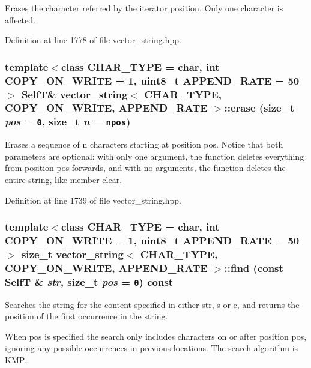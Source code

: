 Erases the character referred by the iterator position. Only one character is affected. 

Definition at line 1778 of file vector\_\-string.hpp.\hypertarget{classvector__string_11798027c9245194f48e666c45e0d6d9}{
\subsubsection[{erase}]{\setlength{\rightskip}{0pt plus 5cm}template$<$class CHAR\_\-TYPE  = char, int COPY\_\-ON\_\-WRITE = 1, uint8\_\-t APPEND\_\-RATE = 50$>$ {\bf SelfT}\& {\bf vector\_\-string}$<$ CHAR\_\-TYPE, COPY\_\-ON\_\-WRITE, APPEND\_\-RATE $>$::erase (size\_\-t {\em pos} = {\tt 0}, \/  size\_\-t {\em n} = {\tt {\bf npos}})}}
\label{classvector__string_11798027c9245194f48e666c45e0d6d9}


Erases a sequence of n characters starting at position pos. Notice that both parameters are optional: with only one argument, the function deletes everything from position pos forwards, and with no arguments, the function deletes the entire string, like member clear. 

Definition at line 1739 of file vector\_\-string.hpp.\hypertarget{classvector__string_5e64e995b1eea8c254bb5ade28fcbf0b}{
\subsubsection[{find}]{\setlength{\rightskip}{0pt plus 5cm}template$<$class CHAR\_\-TYPE  = char, int COPY\_\-ON\_\-WRITE = 1, uint8\_\-t APPEND\_\-RATE = 50$>$ size\_\-t {\bf vector\_\-string}$<$ CHAR\_\-TYPE, COPY\_\-ON\_\-WRITE, APPEND\_\-RATE $>$::find (const {\bf SelfT} \& {\em str}, \/  size\_\-t {\em pos} = {\tt 0}) const}}
\label{classvector__string_5e64e995b1eea8c254bb5ade28fcbf0b}


Searches the string for the content specified in either str, s or c, and returns the position of the first occurrence in the string.

When pos is specified the search only includes characters on or after position pos, ignoring any possible occurrences in previous locations. The search algorithm is KMP.

